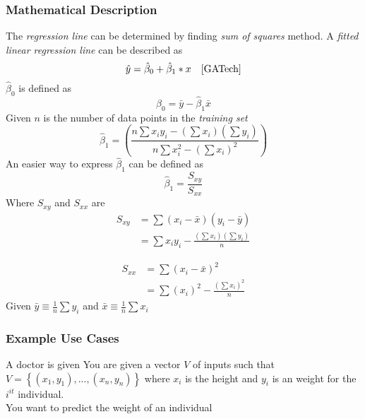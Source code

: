 \documentclass[a4paper]{article}
\begin{document}
\subsubsection{Mathematical Description}
The \textit{regression line} can be determined by finding \textit{sum of squares} method. A
\textit{fitted linear regression line} can be described as
\begin{equation}
\hat y=\hat \beta_{0}+\hat \beta_1*x \, \, \, \, \, \,\cite{GATech}
\end{equation}
$\hat \beta_0$ is defined as 
\begin{equation}
	\hat \beta_0 = \bar y - \hat \beta_1 \bar x
\end{equation}
Given $n$ is the number of data points in the \textit{training set}
\begin{equation}
	\hat \beta_1 = \left(\frac{n \sum x_iy_i - (\sum x_i)(\sum y_i)}{n\sum x_i^2 - (\sum x_i)^2}\right)
\end{equation}
An easier way to express $\hat \beta_1$ can be defined as
\begin{equation}
	\hat \beta_1 = \frac{S_{xy}}{S_{xx}}
\end{equation}
Where $S_{xy}$ and $S_{xx}$ are 
\begin{align*}
S_{xy}&= \sum(x_i-\bar x)(y_i-\bar y) \\
	  &= \sum x_iy_i-\frac{(\sum x_i)(\sum y_i)}{n}
\end{align*}

\begin{align*}
S_{xx} &= \sum(x_i - \bar x)^2 \\
	 &= \sum (x_i)^2 - \frac{(\sum x_i)^2}{n}
\end{align*}
Given $\bar y \equiv \frac{1}{n} \sum y_i$ and $\bar x \equiv \frac{1}{n}\sum x_i$

\subsubsection{Example Use Cases}
A doctor is given  
You are given a vector $V$  of inputs such that $V = \left \{(x_1,y_1), ... ,(x_n,y_n) \right \}$ where $x_i$ is the height and $y_i$ is an weight for the $i^{it}$ individual. \\
You want to predict the weight of an individual
\end{document}
